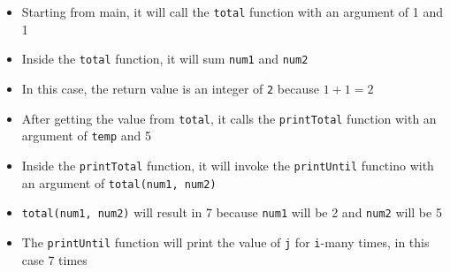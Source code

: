 \documentclass[12pt,titlepage]{article}
\begin{document}
\begin{enumerate}
{        \begin{itemize}
            \item Starting from main, it will call the \texttt{total} function with an argument of 1 and 1
            \item Inside the \texttt{total} function, it will sum \texttt{num1} and \texttt{num2}
            \item In this case, the return value is an integer of \texttt{2} because $1 + 1 = 2$
            \item After getting the value from \texttt{total}, it calls the \texttt{printTotal} function with an argument of \texttt{temp} and 5
            \item Inside the \texttt{printTotal} function, it will invoke the \texttt{printUntil} functino with an argument of \texttt{total(num1, num2)}
            \item \texttt{total(num1, num2)} will result in 7 because \texttt{num1} will be 2 and \texttt{num2} will be 5
            \item The \texttt{printUntil} function will print the value of \texttt{j} for \texttt{i}-many times, in this case 7 times
        \end{itemize}
    }
\end{enumerate}

\pagebreak
\end{document}
